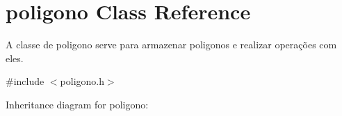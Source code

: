 \hypertarget{classpoligono}{}\section{poligono Class Reference}
\label{classpoligono}


A classe de poligono serve para armazenar poligonos e realizar operações com eles.  




{\ttfamily \#include $<$poligono.\+h$>$}



Inheritance diagram for poligono\+:

